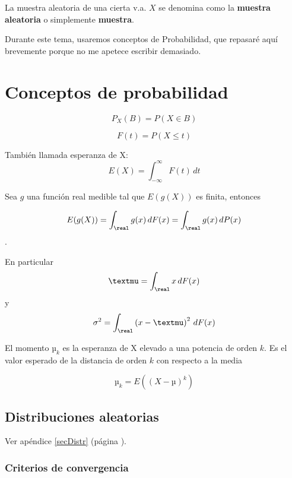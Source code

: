 \documentclass{apuntes}
\begin{document}
La muestra aleatoria de una cierta v.a. $X$ se denomina como la \textbf{muestra aleatoria} o simplemente \textbf{muestra}.

Durante este tema, usaremos conceptos de Probabilidad, que repasaré aquí brevemente porque no me apetece escribir demasiado.

\section{Conceptos de probabilidad}

\begin{defn}
\[ P_X(B) = P(X \in B) \]
\end{defn}

\begin{defn}
\[F(t) = P(X ≤ t) \]
\end{defn}

\begin{defn}  También llamada esperanza de X:
\[ E(X) = \int_{-\infty}^\infty F(t)\,dt \]
\end{defn}

\begin{theorem} Sea $g$ una función real medible tal que $E(g(X))$ es finita, entonces 

\[ E(g(X)) = \int_\real g(x) \, dF(x) = \int_\real g(x)\, dP(x) \]. 

En particular \[ µ =\int_\real x\, dF(x)  \] y \[ \sigma^2 = \int_\real \left(x - µ\right)^2 \, dF(x) \]
\end{theorem}

\begin{defn}[Momento] El momento $µ_k$ es la esperanza de X elevado a una potencia de orden $k$. Es el valor esperado de la distancia de orden $k$ con respecto a la media

\[ µ_k = E\left((X-µ)^k\right) \]
\end{defn}

\subsection{Distribuciones aleatorias}

Ver apéndice \ref{secDistr} (página \pageref{secDistr}).

\subsubsection{Criterios de convergencia}
\end{document}
